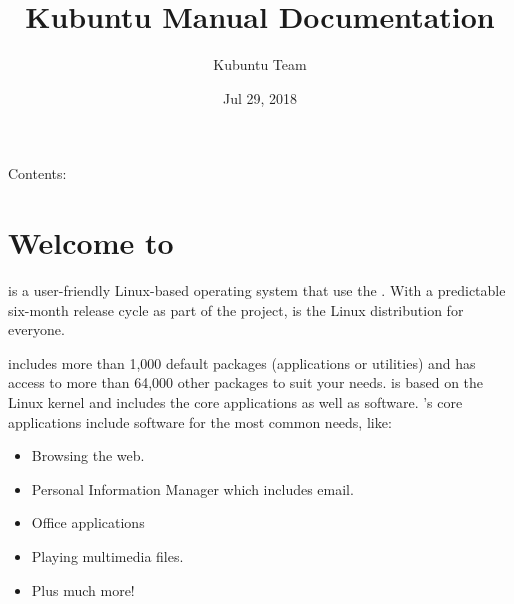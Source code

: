 \documentclass[letterpaper,10pt,english]{sphinxmanual}
\title{Kubuntu Manual Documentation}
\date{Jul 29, 2018}
\author{Kubuntu Team}
\begin{document}
\maketitle
\sphinxtableofcontents
{}\label{\detokenize{index::doc}}


Contents:


\chapter{Welcome to }
\label{\detokenize{welcome:welcome-to-kubuntu}}\label{\detokenize{welcome::doc}}

 is a user-friendly Linux-based operating system that use the  . With a predictable
six-month release cycle as part of the  project,  is the Linux distribution for everyone.

 includes more than 1,000 default packages (applications or utilities) and has access to more than 64,000 other packages to suit your needs.  is based on the Linux kernel and includes the core  applications as well as  software. ’s core applications include software for the most common needs, like:
\begin{itemize}
\item {} 
Browsing the web.

\item {} 
Personal Information Manager which includes email.

\item {} 
Office applications

\item {} 
Playing multimedia files.

\item {} 
Plus much more!

\end{itemize}
\end{document}
